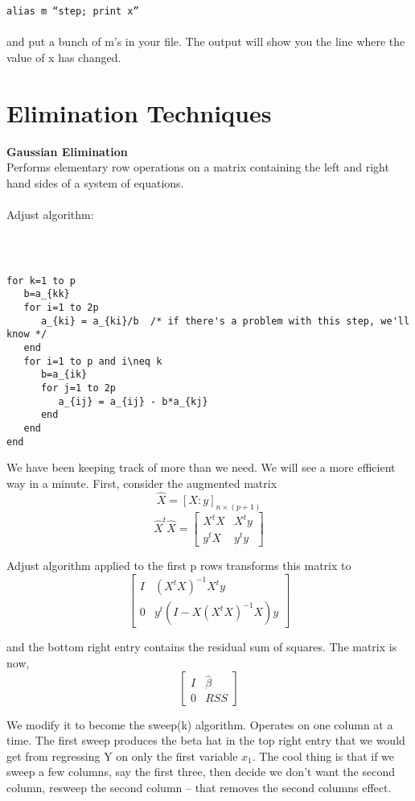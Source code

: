 \documentclass{article}
\begin{document}
{\tt alias m ``step; print  x''}\\\\

and put a bunch of m's in your file.  The output will show you the
line where the value of x has changed.

\section{Elimination Techniques}
{\bf Gaussian Elimination}\\
Performs elementary row operations on a matrix containing the left and
right hand sides of a system of equations.\\\\
Adjust algorithm:\\\\
{\tt
\begin{verbatim}
for k=1 to p
   b=a_{kk} 
   for i=1 to 2p
      a_{ki} = a_{ki}/b  /* if there's a problem with this step, we'll know */
   end
   for i=1 to p and i\neq k
      b=a_{ik}
      for j=1 to 2p
         a_{ij} = a_{ij} - b*a_{kj}
      end
   end
end
\end{verbatim}}

We have been keeping track of more than we need.  We will see a more
efficient way in a minute.  First, consider the augmented matrix
\[\hat X = [X:y]_{n \times (p+1)} \]
\[\hat X^t\hat X =  \left[ \begin{array}{cc}
X^tX & X^ty \\
y^tX & y^ty \end{array} \right]\]

Adjust algorithm applied to the first p rows transforms this matrix to 
\[\left[ \begin{array}{cc}
I & (X^tX)^{-1}X^ty \\
0 & y^t(I-X(X^tX)^{-1}X)y \end{array} \right]\]

and the bottom right entry contains the residual sum of squares.  
The matrix is now,
\[\left[ \begin{array}{cc}
I & \hat \beta \\
0 & RSS \end{array} \right]\]

We modify it to become the sweep(k) algorithm.  Operates on one column at 
a time.  The first sweep produces the beta hat in the top right entry
that we would get from regressing Y on only the first variable $x_1$.
The cool thing is that if we sweep a few columns, say the first three,
then decide we don't want the second column, resweep the second column --
that removes the second columns effect.
\end{document}
